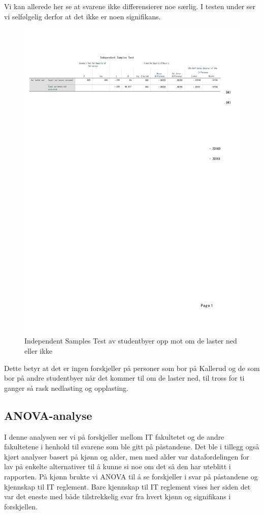Vi kan allerede her se at svarene ikke differensierer noe særlig. I testen under ser vi selfølgelig derfor at det ikke er noen signifikans.

\begin{figure}[H]
    \centering
    \includegraphics[scale=0.7]{case_1/bilder/studentby_lasterned_ttest.pdf}
    \caption{Independent Samples Test av studentbyer opp mot om de laster ned eller ikke}
    \label{fig:studby_lasterned_ttest}
\end{figure}

Dette betyr at det er ingen forskjeller på personer som bor på Kallerud og de som bor på andre studentbyer når det kommer til om de laster ned, til tross for ti ganger så rask nedlasting og opplasting. 

\subsection{ANOVA-analyse}
I denne analysen ser vi på forskjeller mellom IT fakultetet og de andre fakultetene i henhold til svarene som ble gitt på påstandene. Det ble i tillegg også kjørt analyser basert på kjønn og alder, men med alder var datafordelingen for lav på enkelte alternativer til å kunne si noe om det så den har uteblitt i rapporten. På kjønn brukte vi ANOVA til å se forskjeller i svar på påstandene og kjennskap til IT reglement. Bare kjennskap til IT reglement vises her siden det var det eneste med både tilstrekkelig svar fra hvert kjønn og signifikans i forskjellen.

